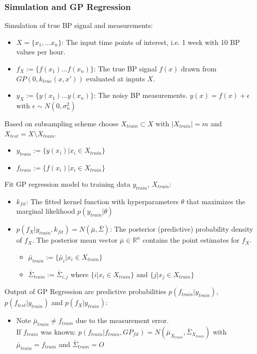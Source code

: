 \documentclass[
	8pt, %
]{beamer}
\begin{document}
\begin{frame}
	\frametitle{Simulation and GP Regression}
	Simulation of true BP signal and measurements:
		\begin{itemize}
			\item $X=\{x_1, \dots x_n\}$: The input time points of interest, i.e. 1 week with 10 BP values per hour.
			\item $f_X := \{f(x_1) \dots f(x_n)\}$: The true BP signal $f(x)$ drawn from $GP(0, k_{true}(x,x'))$ evaluated at inputs $X$.
			\item $y_X := \{y(x_1) \dots y(x_n)\}$: The noisy BP measurements. $y(x)= f(x) + \epsilon$ with $\epsilon \sim N(0, \sigma_n^2)$
		\end{itemize}
	\bigskip
	Based on subsampling scheme choose $X_{train} \subset X$ with $|X_{train}| = m$ and $X_{test} = X \setminus X_{train}$.
	\begin{itemize}
		\item $y_{train} := \{y(x_i) | x_i \in X_{train}\}$
		\item  $f_{train} := \{f(x_i) | x_i \in X_{train}\}$
	\end{itemize}

	\bigskip

	Fit GP regression model to training data $y_{train}$, $X_{train}$:
			\begin{itemize}
				\item $k_{fit}$: The fitted kernel function with hyperparameters $\theta$ that maximizes the marginal likelihood
				$p(y_{train}| \theta)$
				\item $p(f_X| y_{train}, k_{fit}) = N(\bar{\mu}, \bar{\Sigma})$:
				The posterior (predictive) probability density of $f_X$. The posterior mean vector
				$\bar{\mu} \in \mathbb{R}^n$ contains the point estimates for $f_X$.
				\begin{itemize}
					\item $\bar{\mu}_{train} := \{\bar{\mu}_i | x_i \in X_{train}\}$
					\item $\bar{\Sigma}_{train} := \bar{\Sigma}_{i,j}$ where $\{i | x_i \in X_{train}\}$ and $\{j | x_j \in X_{train}\}$

				\end{itemize}
			\end{itemize}
	\bigskip
	Output of GP Regression are predictive probabilities $p(f_{train}| y_{train})$,
		$p(f_{test}| y_{train})$ and $p(f_{X}| y_{train})$:
			\begin{itemize}
				\item Note $\bar{\mu}_{train} \neq f_{train}$ due to the measurement error. \\ If
				$f_{train}$ was known: $p(f_{train}| f_{train}, GP_{fit}) = N(\bar{\mu}_{X_{train}},
				\bar{\Sigma}_{X_{train}})$
				with $\bar{\mu}_{train} = f_{train}$ and $\bar{\Sigma}_{train} = {\displaystyle O}$
			\end{itemize}

\end{frame}
\end{document}
